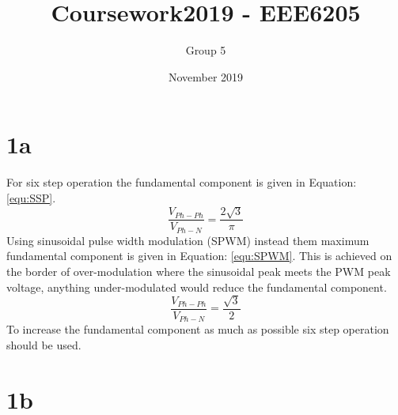 \documentclass{article}
\title{Coursework2019 - EEE6205}
\author{Group 5}
\date{November 2019}
\begin{document}
\maketitle

\section*{1a} 
For six step operation the fundamental component is given in Equation: \ref{equ:SSP}.
\begin{equation}
    \frac{V_{Ph-Ph}}{V_{Ph-N}}=\frac{2 \sqrt{3}}{\pi}
\label{equ:SSP}
\end{equation}
Using sinusoidal pulse width modulation (SPWM) instead them maximum fundamental component is given in Equation: \ref{equ:SPWM}. This is achieved on the border of over-modulation where the sinusoidal peak meets the PWM peak voltage, anything under-modulated would reduce the fundamental component. 
\begin{equation}
\frac{V_{Ph-Ph}}{V_{Ph-N}}=\frac{\sqrt{3}}{2}
    \label{equ:SPWM}
\end{equation}
To increase the fundamental component as much as possible six step operation should be used.


\section*{1b} 
\end{document}
